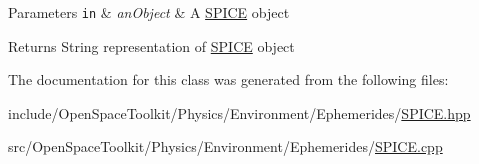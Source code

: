 \begin{DoxyParams}[1]{Parameters}
\mbox{\tt in}  & {\em an\+Object} & A \hyperlink{classostk_1_1physics_1_1env_1_1ephem_1_1_s_p_i_c_e}{S\+P\+I\+CE} object \\
\hline
\end{DoxyParams}
\begin{DoxyReturn}{Returns}
String representation of \hyperlink{classostk_1_1physics_1_1env_1_1ephem_1_1_s_p_i_c_e}{S\+P\+I\+CE} object 
\end{DoxyReturn}


The documentation for this class was generated from the following files\+:\begin{DoxyCompactItemize}
\item 
include/\+Open\+Space\+Toolkit/\+Physics/\+Environment/\+Ephemerides/\hyperlink{_s_p_i_c_e_8hpp}{S\+P\+I\+C\+E.\+hpp}\item 
src/\+Open\+Space\+Toolkit/\+Physics/\+Environment/\+Ephemerides/\hyperlink{_s_p_i_c_e_8cpp}{S\+P\+I\+C\+E.\+cpp}\end{DoxyCompactItemize}
